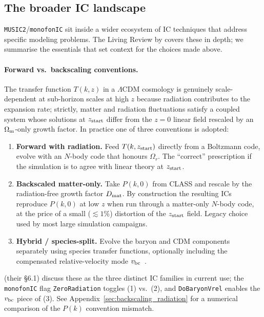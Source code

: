 \documentclass[12pt]{article}
\begin{document}
\subsection{The broader IC landscape}
\label{sec:ic_landscape}

\texttt{MUSIC2}/\texttt{monofonIC} sit inside a wider ecosystem of IC
techniques that address specific modeling problems.  The Living Review
by \citet{Angulo2022} covers these in depth; we summarise the
essentials that set context for the choices made above.

\paragraph{Forward vs.\ backscaling conventions.}
The transfer function $T(k, z)$ in a $\Lambda$CDM cosmology is
genuinely scale-dependent at sub-horizon scales at high $z$ because
radiation contributes to the expansion rate; strictly, matter and
radiation fluctuations satisfy a coupled system whose solutions at
$z_{\rm start}$ differ from the $z=0$ linear field rescaled by an
$\Omega_{\rm m}$-only growth factor.  In practice one of three
conventions is adopted:
%
\begin{enumerate}
  \item \textbf{Forward with radiation.}  Feed $T(k, z_{\rm start})$
        directly from a Boltzmann code, evolve with an $N$-body code
        that honours $\Omega_r$.  The ``correct'' prescription if the
        simulation is to agree with linear theory at $z_{\rm start}$.
  \item \textbf{Backscaled matter-only.}  Take $P(k, 0)$ from CLASS
        and rescale by the radiation-free growth factor $D_{\rm mat}$.
        By construction the resulting ICs reproduce $P(k, 0)$ at low
        $z$ when run through a matter-only $N$-body code, at the price
        of a small ($\lesssim\!1\%$) distortion of the $z_{\rm start}$
        field.  Legacy choice used by most large simulation campaigns.
  \item \textbf{Hybrid / species-split.}  Evolve the baryon and CDM
        components separately using species transfer functions,
        optionally including the compensated relative-velocity mode
        $v_{\rm bc}$~\citep{HahnRampfUhlemann2021}.
\end{enumerate}
%
\citet{Angulo2022} (their \S6.1) discuss these as the three distinct
IC families in current use; the \texttt{monofonIC} flag
\texttt{ZeroRadiation} toggles (1) vs.\ (2), and
\texttt{DoBaryonVrel} enables the $v_{\rm bc}$ piece of (3).  See
Appendix~\ref{sec:backscaling_radiation} for a numerical comparison of
the $P(k)$ convention mismatch.
\end{document}
